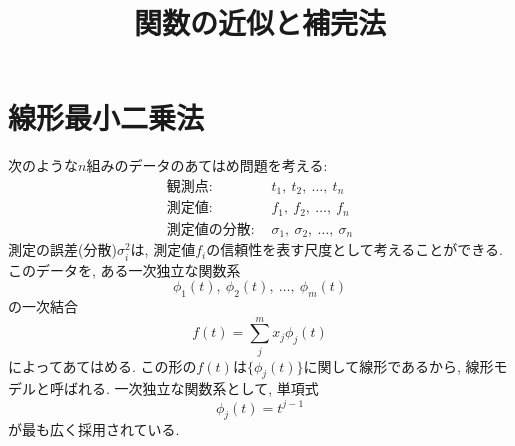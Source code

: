 





\title{関数の近似と補完法}
\maketitle

\section{線形最小二乗法}
次のような$n$組みのデータのあてはめ問題を考える:
\begin{align}
    \mathrm{観測点:}~ & t_{1},~ t_{2},~\ldots,~ t_{n}\\
    \mathrm{測定値:}~ & f_{1},~ f_{2},~\ldots,~ f_{n}\\
    \mathrm{測定値の分散:}~ & \sigma_{1},~ \sigma_{2},~\ldots,~ \sigma_{n}
\end{align}
測定の誤差(分散)$\sigma_{i}^{2}$は, 測定値$f_{i}$の信頼性を表す尺度として考えることができる. 
このデータを, ある一次独立な関数系
\begin{equation}
    \phi_{1}(t),~ \phi_{2}(t),~\ldots,~ \phi_{m}(t)
\end{equation}
の一次結合
\begin{equation}
    f(t) = \sum_{j}^{m} x_{j} \phi_{j}(t)
\end{equation}
によってあてはめる. 
この形の$f(t)$は$\{\phi_{j}(t)\}$に関して線形であるから, 線形モデルと呼ばれる. 
一次独立な関数系として, 単項式
\begin{equation}
    \phi_{j}(t) = t^{j-1}
\end{equation}
が最も広く採用されている. 

